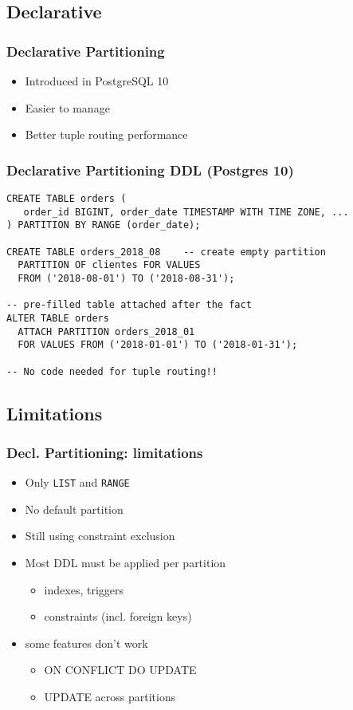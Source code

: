 \subsection{Declarative}
\begin{frame}
  \frametitle{Declarative Partitioning}

  \begin{itemize}
    \item Introduced in PostgreSQL 10
    \item Easier to manage
    \item Better tuple routing performance
  \end{itemize}
\end{frame}

\begin{frame}[fragile]
  \frametitle{Declarative Partitioning DDL (Postgres 10)}

  \lstset{language=SQL}
  \begin{lstlisting}
CREATE TABLE orders (
   order_id BIGINT, order_date TIMESTAMP WITH TIME ZONE, ...
) PARTITION BY RANGE (order_date);

CREATE TABLE orders_2018_08    -- create empty partition
  PARTITION OF clientes FOR VALUES
  FROM ('2018-08-01') TO ('2018-08-31');

-- pre-filled table attached after the fact
ALTER TABLE orders
  ATTACH PARTITION orders_2018_01
  FOR VALUES FROM ('2018-01-01') TO ('2018-01-31');

-- No code needed for tuple routing!!
  \end{lstlisting}

\end{frame}

\subsection{Limitations}
\begin{frame}
  \frametitle{Decl. Partitioning: limitations}

  \begin{itemize}
    \item Only \texttt{LIST} and \texttt{RANGE}
    \item No default partition
    \item Still using constraint exclusion
    \item Most DDL must be applied per partition
      \begin{itemize}
	\item indexes, triggers
	\item constraints (incl. foreign keys)
      \end{itemize}
    \item some features don't work
      \begin{itemize}
	\item ON CONFLICT DO UPDATE
	\item UPDATE across partitions
      \end{itemize}
  \end{itemize}
\end{frame}

